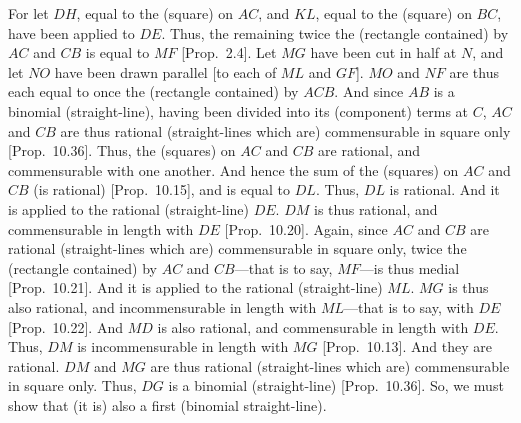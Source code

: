 \begin{Parallel}{}{}
{For let $DH$, equal to the (square) on $AC$,  and $KL$, equal to the
(square) on $BC$, have been applied to $DE$. Thus, the remaining twice
the (rectangle contained) by $AC$ and $CB$ is equal to $MF$ [Prop.~2.4].  Let $MG$ have been cut in half
at $N$, and let $NO$ have been drawn parallel [to each of $ML$ and
$GF$]. $MO$ and $NF$ are thus each equal to once the (rectangle contained)
by $ACB$. And since $AB$ is a binomial (straight-line), having been divided into its (component) terms at $C$,  $AC$ and $CB$ are thus rational (straight-lines which are) commensurable in square only [Prop.~10.36]. Thus, the (squares) on $AC$ and $CB$ are rational, and commensurable with one another.  And hence the
sum of the (squares) on $AC$ and $CB$ (is rational) [Prop.~10.15], and is equal to $DL$. Thus, $DL$
is rational. And it is applied to the rational (straight-line) $DE$. $DM$
is thus rational, and commensurable in length with $DE$ [Prop.~10.20]. Again, since $AC$ and $CB$
are rational (straight-lines which are) commensurable in square only, twice the (rectangle contained) by $AC$ and $CB$---that is to say, $MF$---is thus medial [Prop.~10.21]. And it is applied to the
rational (straight-line) $ML$. $MG$ is thus also rational, and incommensurable in length with $ML$---that is to say, with $DE$
[Prop.~10.22].  And $MD$ is also rational, and
commensurable in length with $DE$. Thus, $DM$ is  incommensurable in length with $MG$ [Prop.~10.13]. And
they are rational. $DM$ and $MG$ are thus rational (straight-lines which
are) commensurable in square only. Thus, $DG$ is a binomial (straight-line)
[Prop.~10.36]. So, we must show that (it is)
also a first (binomial straight-line).

}
\end{Parallel}
